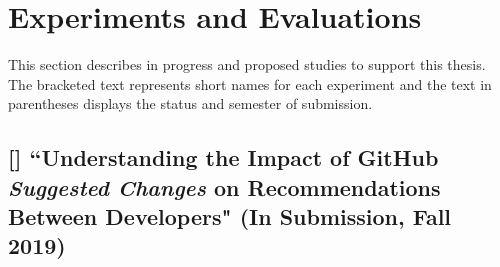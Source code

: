 \section{Experiments and Evaluations}

This section describes in progress and proposed studies to support this thesis. The bracketed text represents short names for each experiment and the text in parentheses displays the status and semester of submission.



\subsection{[\suggT] ``Understanding the Impact of GitHub \emph{Suggested Changes} on Recommendations Between Developers" (In Submission, Fall 2019)}

